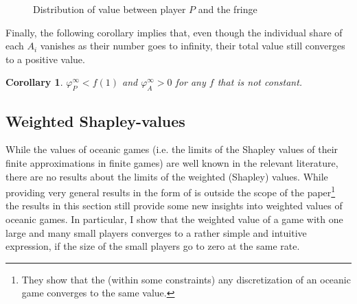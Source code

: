 \documentclass[a4paper]{article}
\newtheorem{corollary}{Corollary}
\begin{document}
\begin{figure}
    \centering
    \caption{Distribution of value between player $P$ and the fringe}
    \label{fig:one_sided}
\end{figure}

Finally, the following corollary implies that, even though the individual share of each $A_i$ vanishes as their number goes to infinity, their total value still converges to a positive value.
\begin{corollary}
    \label{cor:fringe_value_2}
    $\varphi_P^\infty < f(1)$ and $\varphi_A^\infty > 0$ for any $f$ that is not constant.
\end{corollary}


\subsection{Weighted Shapley-values}

While the values of oceanic games (i.e. the limits of the Shapley values of their finite approximations in finite games) are well known in the relevant literature, there are no results about the limits of the weighted (Shapley) values.
While providing very general results in the form of \textcite[]{fogelman1980asymptotic} is outside the scope of the paper\footnote{
    They show that the (within some constraints) any discretization of an oceanic game converges to the same value.
} the results in this section still provide some new insights into weighted values of oceanic games.
In particular, I show that the weighted value of a game with one large and many small players converges to a rather simple and intuitive expression, if the size of the small players go to zero at the same rate.
\end{document}
